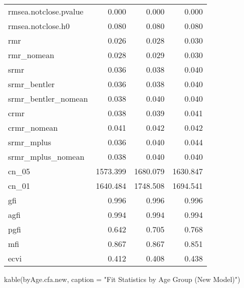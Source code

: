 \documentclass[
  letterpaper,
  DIV=11,
  numbers=noendperiod]{scrartcl}
\newenvironment{Shaded}{\begin{snugshade}}{\end{snugshade}}
\newcommand{\AttributeTok}[1]{\textcolor[rgb]{0.40,0.45,0.13}{#1}}
\newcommand{\FunctionTok}[1]{\textcolor[rgb]{0.28,0.35,0.67}{#1}}
\newcommand{\NormalTok}[1]{\textcolor[rgb]{0.00,0.23,0.31}{#1}}
\newcommand{\StringTok}[1]{\textcolor[rgb]{0.13,0.47,0.30}{#1}}
\begin{document}
\begin{longtable}[]{@{}lrrr@{}}
rmsea.notclose.pvalue & 0.000 & 0.000 & 0.000 \\
rmsea.notclose.h0 & 0.080 & 0.080 & 0.080 \\
rmr & 0.026 & 0.028 & 0.030 \\
rmr\_nomean & 0.028 & 0.029 & 0.030 \\
srmr & 0.036 & 0.038 & 0.040 \\
srmr\_bentler & 0.036 & 0.038 & 0.040 \\
srmr\_bentler\_nomean & 0.038 & 0.040 & 0.040 \\
crmr & 0.038 & 0.039 & 0.041 \\
crmr\_nomean & 0.041 & 0.042 & 0.042 \\
srmr\_mplus & 0.036 & 0.040 & 0.044 \\
srmr\_mplus\_nomean & 0.038 & 0.040 & 0.040 \\
cn\_05 & 1573.399 & 1680.079 & 1630.847 \\
cn\_01 & 1640.484 & 1748.508 & 1694.541 \\
gfi & 0.996 & 0.996 & 0.996 \\
agfi & 0.994 & 0.994 & 0.994 \\
pgfi & 0.642 & 0.705 & 0.768 \\
mfi & 0.867 & 0.867 & 0.851 \\
ecvi & 0.412 & 0.408 & 0.438 \\
\end{longtable}

\begin{Shaded}
\begin{Highlighting}[]
\FunctionTok{kable}\NormalTok{(byAge.cfa.new,}
      \AttributeTok{caption =} \StringTok{"Fit Statistics by Age Group (New Model)"}\NormalTok{)}
\end{Highlighting}
\end{Shaded}
\end{document}

